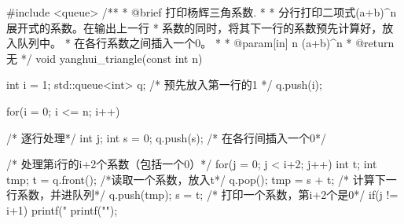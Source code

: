 \begin{Codex}[label=yanghui_triangle.cpp]
#include <queue>
/**
 * @brief 打印杨辉三角系数.
 *
 * 分行打印二项式(a+b)^n展开式的系数。在输出上一行
 * 系数的同时，将其下一行的系数预先计算好，放入队列中。
 * 在各行系数之间插入一个0。
 *
 * @param[in] n (a+b)^n
 * @return 无
 */
void yanghui_triangle(const int n) {
    int i = 1;
    std::queue<int> q;
    /* 预先放入第一行的1 */
    q.push(i);

    for(i = 0; i <= n; i++) {     /* 逐行处理*/
        int j;
        int s = 0;
        q.push(s);      /* 在各行间插入一个0*/

        /* 处理第i行的i+2个系数（包括一个0）*/
        for(j = 0; j < i+2; j++) {
            int t;
            int tmp;
            t = q.front();  /*读取一个系数，放入t*/
            q.pop();
            tmp = s + t;      /* 计算下一行系数，并进队列*/
            q.push(tmp);
            s = t;            /* 打印一个系数，第i+2个是0*/
            if(j != i+1) {
                printf("%
            }
        }
        printf("\n"); 
    }
}
\end{Codex}
